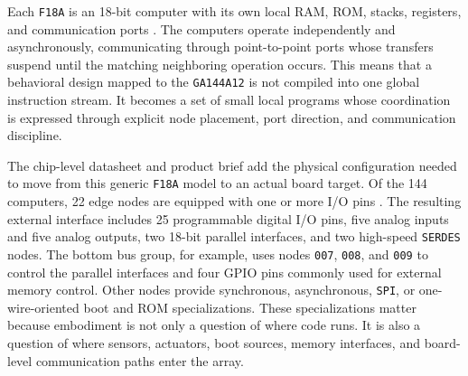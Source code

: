\documentclass[11pt]{article}
\begin{document}
Each \texttt{F18A} is an 18-bit computer with its own local RAM, ROM,
stacks, registers, and communication ports \citep{greenarrays2011db001}.
The computers operate independently and asynchronously, communicating
through point-to-point ports whose transfers suspend until the matching
neighboring operation occurs. This means that a behavioral design mapped to
the \texttt{GA144A12} is not compiled into one global instruction stream.
It becomes a set of small local programs whose coordination is expressed
through explicit node placement, port direction, and communication
discipline.

The chip-level datasheet and product brief add the physical configuration
needed to move from this generic \texttt{F18A} model to an actual board
target. Of the 144 computers, 22 edge nodes are equipped with one or more
I/O pins \citep{greenarrays2026ga144a12,cartheur2026pb001}. The resulting
external interface includes 25 programmable digital I/O pins, five analog
inputs and five analog outputs, two 18-bit parallel interfaces, and two
high-speed \texttt{SERDES} nodes. The bottom bus group, for example, uses
nodes \texttt{007}, \texttt{008}, and \texttt{009} to control the parallel
interfaces and four GPIO pins commonly used for external memory control.
Other nodes provide synchronous, asynchronous, \texttt{SPI}, or
one-wire-oriented boot and ROM specializations. These specializations
matter because embodiment is not only a question of where code runs. It is
also a question of where sensors, actuators, boot sources, memory
interfaces, and board-level communication paths enter the array.
\end{document}
